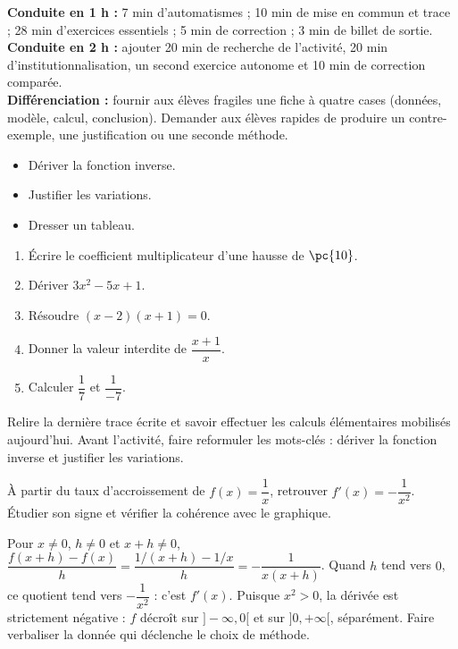 \ifmxteacher
\begin{method}
\textbf{Conduite en 1 h :} 7 min d'automatismes ; 10 min de mise en commun et trace ; 28 min d'exercices essentiels ; 5 min de correction ; 3 min de billet de sortie.\\
\textbf{Conduite en 2 h :} ajouter 20 min de recherche de l'activité, 20 min d'institutionnalisation, un second exercice autonome et 10 min de correction comparée.\\
\textbf{Différenciation :} fournir aux élèves fragiles une fiche à quatre cases (données, modèle, calcul, conclusion). Demander aux élèves rapides de produire un contre-exemple, une justification ou une seconde méthode.
\end{method}
\fi
{}
\begin{objectives}\begin{itemize}\item Dériver la fonction inverse.\item Justifier les variations.\item Dresser un tableau.\end{itemize}\end{objectives}
\begin{fluency}\begin{enumerate}\item Écrire le coefficient multiplicateur d'une hausse de $\pc{10}$. \item Dériver $3x^2-5x+1$. \item Résoudre $(x-2)(x+1)=0$. \item Donner la valeur interdite de $\dfrac{x+1}{x}$. \item Calculer $\dfrac1{7}$ et $\dfrac1{-7}$. \end{enumerate}\end{fluency}
\begin{prerequisites}Relire la dernière trace écrite et savoir effectuer les calculs élémentaires mobilisés aujourd'hui. Avant l'activité, faire reformuler les mots-clés : dériver la fonction inverse et justifier les variations.\end{prerequisites}

\begin{activity}
À partir du taux d'accroissement de $f(x)=\dfrac1x$, retrouver $f'(x)=-\dfrac1{x^2}$. Étudier son signe et vérifier la cohérence avec le graphique.

\end{activity}
\begin{solution}Pour $x\neq0$, $h\neq0$ et $x+h\neq0$, $\dfrac{f(x+h)-f(x)}h=\dfrac{1/(x+h)-1/x}{h}=-\dfrac1{x(x+h)}$. Quand $h$ tend vers $0$, ce quotient tend vers $-\dfrac1{x^2}$ : c'est $f'(x)$. Puisque $x^2>0$, la dérivée est strictement négative : $f$ décroît sur $]-\infty,0[$ et sur $]0,+\infty[$, séparément. Faire verbaliser la donnée qui déclenche le choix de méthode.\end{solution}

